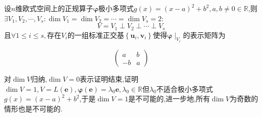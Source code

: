 \begin{formal}
    \begin{theorem}[一般极小多项式的空间的结构]\label{thm:一般极小多项式的空间的结构}
        设$n$维欧式空间上的正规算子$\bm{\varphi}$极小多项式$g\left(x\right)=\left(x-a\right)^2+b^2,a,b\neq0\in\mathbb{R}$,则$\exists V_1,V_2,\cdots,V_s:\dim V_1=\dim V_2=\cdots=\dim V_s=2:$\[
        V=V_1\perp V_2\perp\cdots\perp V_s
        \]且$\forall1\leqslant i\leqslant s,$存在$V_i$的一组标准正交基$\left\{\bm{u}_i,\bm{v}_i\right\}$使得$\bm{\varphi}\mid_{V_i}$的表示矩阵为
        
        \[
        \begin{pmatrix}
            a&b\\
            -b&a
        \end{pmatrix}
        \]
    \end{theorem}
    \begin{Proof}
        对$\dim V$归纳,$\dim V=0$表示证明结束,证明$\dim V=1,V=L\left(\bm{e}\right),\bm{\varphi}\left(\bm{e}\right)=\lambda_0\bm{e},\lambda_0\in\mathbb{R}$但$\lambda_0$不适合极小多项式$g\left(x\right)=\left(x-a\right)^2+b^2$,于是$\dim V=1$是不可能的,进一步地,所有$\dim V$为奇数的情形也是不可能的.


\end{Proof}
\end{formal}
